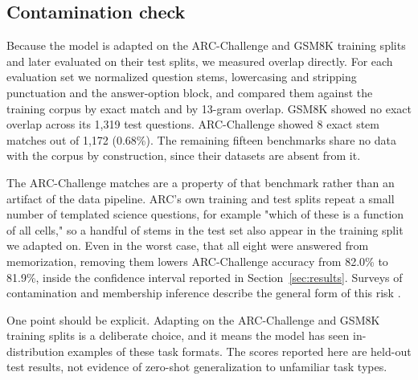 \subsection{Contamination check}
Because the model is adapted on the ARC-Challenge and GSM8K training splits and later evaluated on their test splits, we measured overlap directly. For each evaluation set we normalized question stems, lowercasing and stripping punctuation and the answer-option block, and compared them against the training corpus by exact match and by 13-gram overlap. GSM8K showed no exact overlap across its 1{,}319 test questions. ARC-Challenge showed 8 exact stem matches out of 1{,}172 (0.68\%). The remaining fifteen benchmarks share no data with the corpus by construction, since their datasets are absent from it.

The ARC-Challenge matches are a property of that benchmark rather than an artifact of the data pipeline. ARC's own training and test splits repeat a small number of templated science questions, for example "which of these is a function of all cells," so a handful of stems in the test set also appear in the training split we adapted on. Even in the worst case, that all eight were answered from memorization, removing them lowers ARC-Challenge accuracy from 82.0\% to 81.9\%, inside the confidence interval reported in Section~\ref{sec:results}. Surveys of contamination and membership inference describe the general form of this risk \citep{tong2026contamination}.

One point should be explicit. Adapting on the ARC-Challenge and GSM8K training splits is a deliberate choice, and it means the model has seen in-distribution examples of these task formats. The scores reported here are held-out test results, not evidence of zero-shot generalization to unfamiliar task types.
